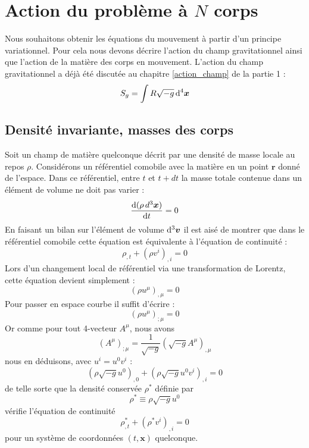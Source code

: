 	\section{Action du problème à $N$ corps}

		Nous souhaitons obtenir les équations du mouvement à partir d'un principe variationnel. Pour cela nous devons décrire l'action du champ gravitationnel ainsi que l'action de la matière des corps en mouvement. L'action du champ gravitationnel a déjà été discutée au chapitre \ref{action_champ} de la partie 1 :
		\begin{equation}
			S_g = \int R \sqrt{-g} \, \mathrm{d}^4 \bm{x}
		\end{equation}

		\subsection{Densité invariante, masses des corps}

			Soit un champ de matière quelconque décrit par une densité de masse locale au repos $\rho$. Considérons un référentiel comobile avec la matière en un point $\bm{r}$ donné de l'espace. Dans ce référentiel, entre $t$ et $t+dt$ la masse totale contenue dans un élément de volume ne doit pas varier :
			\begin{equation}
				\frac{\mathrm{d}(\rho \, d^3\bm{x})}{\mathrm{d} t} = 0
			\end{equation}
			En faisant un bilan sur l'élément de volume $\mathrm{d}^3\bm{v}$ il est aisé de montrer que dans le référentiel comobile cette équation est équivalente à l'équation de continuité :
			\begin{equation}
				\rho_{,t} + (\rho v^i)_{,i} = 0		
			\end{equation}	
			Lors d'un changement local de référentiel via une transformation de Lorentz, cette équation devient simplement :
			\begin{equation}
				(\rho u^\mu)_{,\mu}=0
			\end{equation}
			Pour passer en espace courbe il suffit d'écrire :
			\begin{equation}
				(\rho u^\mu)_{;\mu}=0
			\end{equation}
			Or comme pour tout 4-vecteur $A^\mu$, nous avons 
			\begin{equation}
				(A^\mu)_{;\mu}=\frac{1}{\sqrt{-g}}(\sqrt{-g}A^\mu)_{,\mu}
			\end{equation}
			nous en déduisons, avec $u^i=u^0v^i$ :
			\begin{equation}
				(\rho\sqrt{-g}u^0)_{,0}+(\rho\sqrt{-g}u^0v^i)_{,i}=0
			\end{equation}
			de telle sorte que la densité conservée $\rho^*$ définie par
			\begin{equation}
				\rho^*\equiv \rho \sqrt{-g}u^0
			\end{equation}
			vérifie l'équation de continuité
			\begin{equation}
				\rho^*_{,t}+(\rho^*v^i)_{,i}=0
			\end{equation}
			pour un système de coordonnées $(t,\bm{x})$ quelconque.

